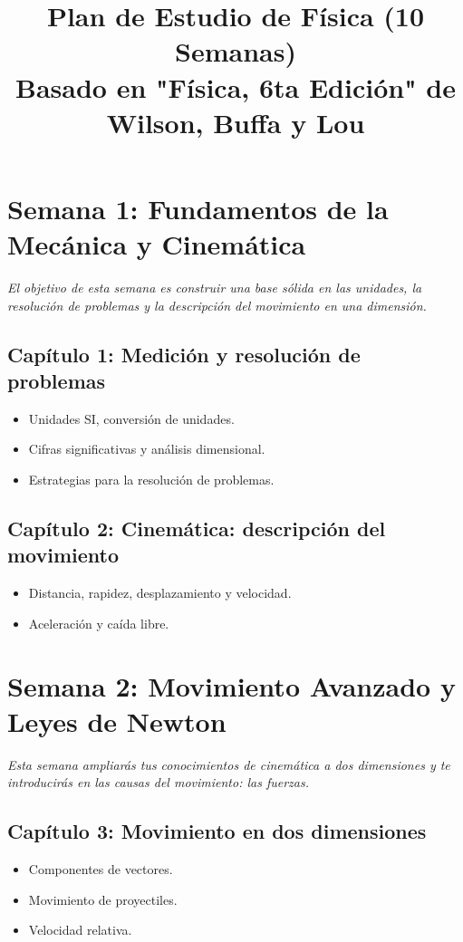 \documentclass[12pt, a4paper]{article}
\begin{document}
\title{\bfseries Plan de Estudio de Física (10 Semanas)\\ \large Basado en "Física, 6ta Edición" de Wilson, Buffa y Lou}
\author{}
\date{}
\maketitle
\thispagestyle{empty}
\vspace{-2cm}

\section*{Semana 1: Fundamentos de la Mecánica y Cinemática}
\textit{El objetivo de esta semana es construir una base sólida en las unidades, la resolución de problemas y la descripción del movimiento en una dimensión.}
\subsection*{Capítulo 1: Medición y resolución de problemas}
\begin{itemize}[leftmargin=*]
    \item Unidades SI, conversión de unidades.
    \item Cifras significativas y análisis dimensional.
    \item Estrategias para la resolución de problemas.
\end{itemize}
\subsection*{Capítulo 2: Cinemática: descripción del movimiento}
\begin{itemize}[leftmargin=*]
    \item Distancia, rapidez, desplazamiento y velocidad.
    \item Aceleración y caída libre.
\end{itemize}

\section*{Semana 2: Movimiento Avanzado y Leyes de Newton}
\textit{Esta semana ampliarás tus conocimientos de cinemática a dos dimensiones y te introducirás en las causas del movimiento: las fuerzas.}
\subsection*{Capítulo 3: Movimiento en dos dimensiones}
\begin{itemize}[leftmargin=*]
    \item Componentes de vectores.
    \item Movimiento de proyectiles.
    \item Velocidad relativa.
\end{itemize}
\end{document}
